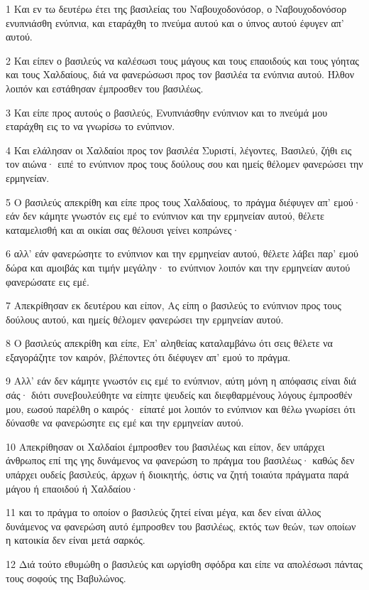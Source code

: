 \par 1 Και εν τω δευτέρω έτει της βασιλείας του Ναβουχοδονόσορ, ο Ναβουχοδονόσορ ενυπνιάσθη ενύπνια, και εταράχθη το πνεύμα αυτού και ο ύπνος αυτού έφυγεν απ' αυτού.
\par 2 Και είπεν ο βασιλεύς να καλέσωσι τους μάγους και τους επαοιδούς και τους γόητας και τους Χαλδαίους, διά να φανερώσωσι προς τον βασιλέα τα ενύπνια αυτού. Ήλθον λοιπόν και εστάθησαν έμπροσθεν του βασιλέως.
\par 3 Και είπε προς αυτούς ο βασιλεύς, Ενυπνιάσθην ενύπνιον και το πνεύμά μου εταράχθη εις το να γνωρίσω το ενύπνιον.
\par 4 Και ελάλησαν οι Χαλδαίοι προς τον βασιλέα Συριστί, λέγοντες, Βασιλεύ, ζήθι εις τον αιώνα· ειπέ το ενύπνιον προς τους δούλους σου και ημείς θέλομεν φανερώσει την ερμηνείαν.
\par 5 Ο βασιλεύς απεκρίθη και είπε προς τους Χαλδαίους, το πράγμα διέφυγεν απ' εμού· εάν δεν κάμητε γνωστόν εις εμέ το ενύπνιον και την ερμηνείαν αυτού, θέλετε καταμελισθή και αι οικίαι σας θέλουσι γείνει κοπρώνες·
\par 6 αλλ' εάν φανερώσητε το ενύπνιον και την ερμηνείαν αυτού, θέλετε λάβει παρ' εμού δώρα και αμοιβάς και τιμήν μεγάλην· το ενύπνιον λοιπόν και την ερμηνείαν αυτού φανερώσατε εις εμέ.
\par 7 Απεκρίθησαν εκ δευτέρου και είπον, Ας είπη ο βασιλεύς το ενύπνιον προς τους δούλους αυτού, και ημείς θέλομεν φανερώσει την ερμηνείαν αυτού.
\par 8 Ο βασιλεύς απεκρίθη και είπε, Επ' αληθείας καταλαμβάνω ότι σεις θέλετε να εξαγοράζητε τον καιρόν, βλέποντες ότι διέφυγεν απ' εμού το πράγμα.
\par 9 Αλλ' εάν δεν κάμητε γνωστόν εις εμέ το ενύπνιον, αύτη μόνη η απόφασις είναι διά σάς· διότι συνεβουλεύθητε να είπητε ψευδείς και διεφθαρμένους λόγους έμπροσθέν μου, εωσού παρέλθη ο καιρός· είπατέ μοι λοιπόν το ενύπνιον και θέλω γνωρίσει ότι δύνασθε να φανερώσητε εις εμέ και την ερμηνείαν αυτού.
\par 10 Απεκρίθησαν οι Χαλδαίοι έμπροσθεν του βασιλέως και είπον, δεν υπάρχει άνθρωπος επί της γης δυνάμενος να φανερώση το πράγμα του βασιλέως· καθώς δεν υπάρχει ουδείς βασιλεύς, άρχων ή διοικητής, όστις να ζητή τοιαύτα πράγματα παρά μάγου ή επαοιδού ή Χαλδαίου·
\par 11 και το πράγμα το οποίον ο βασιλεύς ζητεί είναι μέγα, και δεν είναι άλλος δυνάμενος να φανερώση αυτό έμπροσθεν του βασιλέως, εκτός των θεών, των οποίων η κατοικία δεν είναι μετά σαρκός.
\par 12 Διά τούτο εθυμώθη ο βασιλεύς και ωργίσθη σφόδρα και είπε να απολέσωσι πάντας τους σοφούς της Βαβυλώνος.
